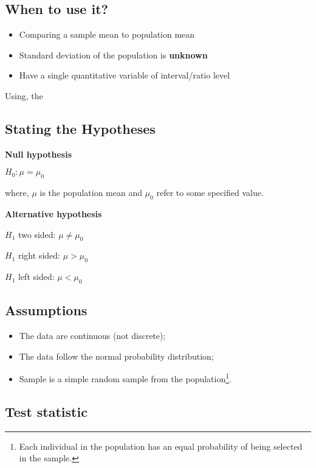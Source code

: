 \documentclass[
]{article}
\providecommand{\tightlist}{%
  \setlength{\itemsep}{0pt}\setlength{\parskip}{0pt}}
\begin{document}
\hypertarget{when-to-use-it-1}{%
\subsection{When to use it?}\label{when-to-use-it-1}}

\begin{itemize}
\tightlist
\item
  Comparing a sample mean to population mean
\item
  Standard deviation of the population is \textbf{unknown}
\item
  Have a single quantitative variable of interval/ratio level
\end{itemize}

Using, the

\hypertarget{stating-the-hypotheses-1}{%
\subsection{Stating the Hypotheses}\label{stating-the-hypotheses-1}}

\textbf{Null hypothesis}

\(H_0:\mu = \mu_0\)

where, \(\mu\) is the population mean and \(\mu_0\) refer to some specified value.

\textbf{Alternative hypothesis}

\(H_1\) two sided: \(\mu \ne \mu_0\)

\(H_1\) right sided: \(\mu > \mu_0\)

\(H_1\) left sided: \(\mu < \mu_0\)

\hypertarget{assumptions-1}{%
\subsection{Assumptions}\label{assumptions-1}}

\begin{itemize}
\tightlist
\item
  The data are continuous (not discrete);
\item
  The data follow the normal probability distribution;
\item
  Sample is a simple random sample from the population\footnote{Each individual in the population has an equal probability of being selected in the sample.}.
\end{itemize}

\hypertarget{test-statistic-1}{%
\subsection{Test statistic}\label{test-statistic-1}}
\end{document}
